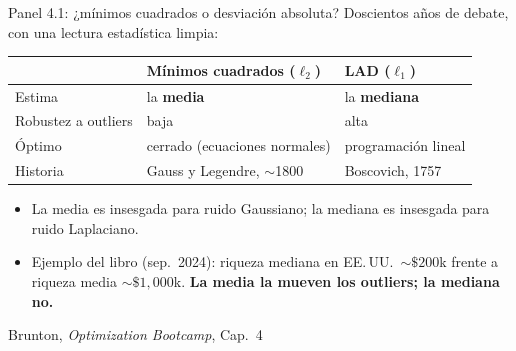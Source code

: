 \documentclass[10pt,aspectratio=169]{beamer}
\newcommand{\fuente}{\vfill{\scriptsize\color{gray}Brunton, \emph{Optimization Bootcamp}, Cap.~4}}
\begin{document}
\begin{frame}{Panel 4.1: ¿mínimos cuadrados o desviación absoluta?}
  \small
  Doscientos años de debate, con una lectura estadística limpia:

  \vspace{2mm}
  \centering
  \begin{tabular}{@{}lll@{}}
    \toprule
    & \textbf{Mínimos cuadrados} ($\ell_2$) & \textbf{LAD} ($\ell_1$) \\
    \midrule
    Estima               & la \textbf{media}   & la \textbf{mediana} \\
    Robustez a outliers  & baja                & alta \\
    Óptimo               & cerrado (ecuaciones normales) & programación lineal \\
    Historia             & Gauss y Legendre, $\sim$1800 & Boscovich, 1757 \\
    \bottomrule
  \end{tabular}

  \vspace{4mm}
  \raggedright
  \begin{itemize}
    \item La media es insesgada para ruido Gaussiano; la mediana es insesgada
      para ruido Laplaciano.
    \item Ejemplo del libro (sep.\ 2024): riqueza mediana en EE.\,UU.\
      $\sim\$200$k frente a riqueza media $\sim\$1{,}000$k.
      \textbf{La media la mueven los outliers; la mediana no.}
  \end{itemize}
  \fuente
\end{frame}
\end{document}
